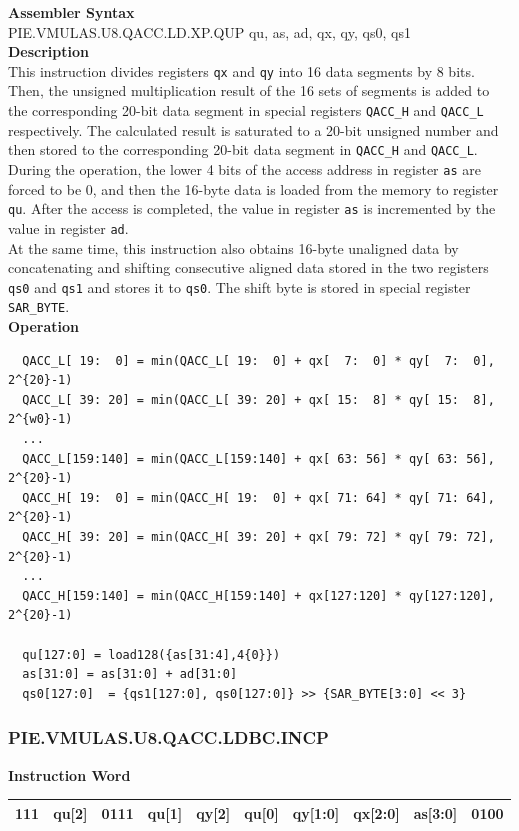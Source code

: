 \textbf{Assembler Syntax} \\
PIE.VMULAS.U8.QACC.LD.XP.QUP qu, as, ad, qx, qy, qs0, qs1 \\
\textbf{Description} \\
This instruction divides registers \lstinline{qx} and \lstinline{qy} into 16 data segments by 8 bits. Then, the unsigned multiplication result of the 16 sets of segments is added to the corresponding 20-bit data segment in special registers \lstinline{QACC_H} and \lstinline{QACC_L} respectively. The calculated result is saturated to a 20-bit unsigned number and then stored to the corresponding 20-bit data segment in \lstinline{QACC_H} and \lstinline{QACC_L}.\\
During the operation, the lower 4 bits of the access address in register \lstinline{as} are forced to be 0, and then the 16-byte data is loaded from the memory to register \lstinline{qu}. After the access is completed, the value in register \lstinline{as} is incremented by the value in register \lstinline{ad}.\\
At the same time, this instruction also obtains 16-byte unaligned data by concatenating and shifting consecutive aligned data stored in the two registers \lstinline{qs0} and \lstinline{qs1} and stores it to \lstinline{qs0}. The shift byte is stored in special register \lstinline{SAR_BYTE}.\\
\textbf{Operation}
\begin{lstlisting}
  QACC_L[ 19:  0] = min(QACC_L[ 19:  0] + qx[  7:  0] * qy[  7:  0], 2^{20}-1)
  QACC_L[ 39: 20] = min(QACC_L[ 39: 20] + qx[ 15:  8] * qy[ 15:  8], 2^{w0}-1)
  ...
  QACC_L[159:140] = min(QACC_L[159:140] + qx[ 63: 56] * qy[ 63: 56], 2^{20}-1)
  QACC_H[ 19:  0] = min(QACC_H[ 19:  0] + qx[ 71: 64] * qy[ 71: 64], 2^{20}-1)
  QACC_H[ 39: 20] = min(QACC_H[ 39: 20] + qx[ 79: 72] * qy[ 79: 72], 2^{20}-1)
  ...
  QACC_H[159:140] = min(QACC_H[159:140] + qx[127:120] * qy[127:120], 2^{20}-1)

  qu[127:0] = load128({as[31:4],4{0}})
  as[31:0] = as[31:0] + ad[31:0]
  qs0[127:0]  = {qs1[127:0], qs0[127:0]} >> {SAR_BYTE[3:0] << 3}
\end{lstlisting}

\newpage
\subsubsection{PIE.VMULAS.U8.QACC.LDBC.INCP}\label{instruction:PIEVMULASU8QACCLDBCINCP}
\setlength\tabcolsep{6pt}
\textbf{Instruction Word} \\
\begin{tabular}{|c|c|c|c|c|c|c|c|c|c|}
	\hline
	111 & qu[2] & 0111 & qu[1] & qy[2] & qu[0] & qy[1:0] & qx[2:0] & as[3:0] & 0100 \\
	\hline
\end{tabular}

